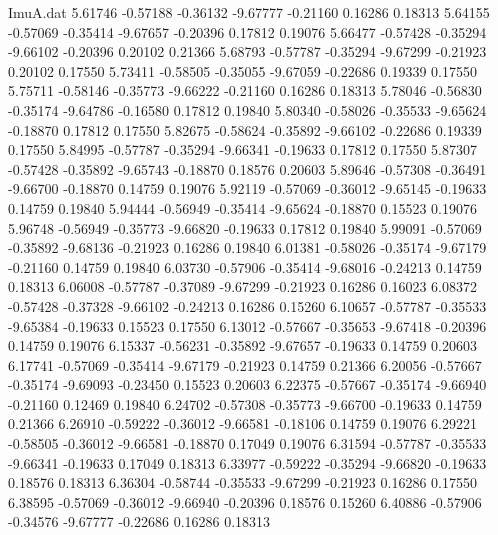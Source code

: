 \begin{filecontents}{ImuA.dat}
   5.61746   -0.57188   -0.36132   -9.67777   -0.21160    0.16286    0.18313
   5.64155   -0.57069   -0.35414   -9.67657   -0.20396    0.17812    0.19076
   5.66477   -0.57428   -0.35294   -9.66102   -0.20396    0.20102    0.21366
   5.68793   -0.57787   -0.35294   -9.67299   -0.21923    0.20102    0.17550
   5.73411   -0.58505   -0.35055   -9.67059   -0.22686    0.19339    0.17550
   5.75711   -0.58146   -0.35773   -9.66222   -0.21160    0.16286    0.18313
   5.78046   -0.56830   -0.35174   -9.64786   -0.16580    0.17812    0.19840
   5.80340   -0.58026   -0.35533   -9.65624   -0.18870    0.17812    0.17550
   5.82675   -0.58624   -0.35892   -9.66102   -0.22686    0.19339    0.17550
   5.84995   -0.57787   -0.35294   -9.66341   -0.19633    0.17812    0.17550
   5.87307   -0.57428   -0.35892   -9.65743   -0.18870    0.18576    0.20603
   5.89646   -0.57308   -0.36491   -9.66700   -0.18870    0.14759    0.19076
   5.92119   -0.57069   -0.36012   -9.65145   -0.19633    0.14759    0.19840
   5.94444   -0.56949   -0.35414   -9.65624   -0.18870    0.15523    0.19076
   5.96748   -0.56949   -0.35773   -9.66820   -0.19633    0.17812    0.19840
   5.99091   -0.57069   -0.35892   -9.68136   -0.21923    0.16286    0.19840
   6.01381   -0.58026   -0.35174   -9.67179   -0.21160    0.14759    0.19840
   6.03730   -0.57906   -0.35414   -9.68016   -0.24213    0.14759    0.18313
   6.06008   -0.57787   -0.37089   -9.67299   -0.21923    0.16286    0.16023
   6.08372   -0.57428   -0.37328   -9.66102   -0.24213    0.16286    0.15260
   6.10657   -0.57787   -0.35533   -9.65384   -0.19633    0.15523    0.17550
   6.13012   -0.57667   -0.35653   -9.67418   -0.20396    0.14759    0.19076
   6.15337   -0.56231   -0.35892   -9.67657   -0.19633    0.14759    0.20603
   6.17741   -0.57069   -0.35414   -9.67179   -0.21923    0.14759    0.21366
   6.20056   -0.57667   -0.35174   -9.69093   -0.23450    0.15523    0.20603
   6.22375   -0.57667   -0.35174   -9.66940   -0.21160    0.12469    0.19840
   6.24702   -0.57308   -0.35773   -9.66700   -0.19633    0.14759    0.21366
   6.26910   -0.59222   -0.36012   -9.66581   -0.18106    0.14759    0.19076
   6.29221   -0.58505   -0.36012   -9.66581   -0.18870    0.17049    0.19076
   6.31594   -0.57787   -0.35533   -9.66341   -0.19633    0.17049    0.18313
   6.33977   -0.59222   -0.35294   -9.66820   -0.19633    0.18576    0.18313
   6.36304   -0.58744   -0.35533   -9.67299   -0.21923    0.16286    0.17550
   6.38595   -0.57069   -0.36012   -9.66940   -0.20396    0.18576    0.15260
   6.40886   -0.57906   -0.34576   -9.67777   -0.22686    0.16286    0.18313

\end{filecontents}
